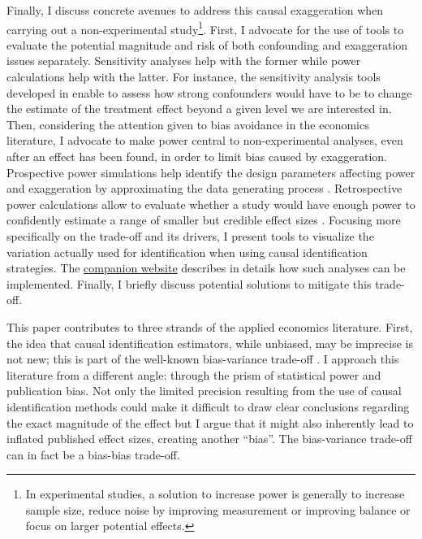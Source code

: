 			Finally, I discuss concrete avenues to address this causal exaggeration when carrying out a non-experimental study\footnote{In experimental studies, a solution to increase power is generally to increase sample size, reduce noise by improving measurement or improving balance or focus on larger potential effects.}. First, I advocate for the use of tools to evaluate the potential magnitude and risk of both confounding and exaggeration issues separately. Sensitivity analyses help with the former while power calculations help with the latter. %
			For instance, the sensitivity analysis tools developed in \cite{cinelli_making_2020} enable to assess how strong confounders would have to be to change the estimate of the treatment effect beyond a given level we are interested in. Then, considering the attention given to bias avoidance in the economics literature, I advocate to make power central to non-experimental analyses, even after an effect has been found, in order to limit bias caused by exaggeration. Prospective power simulations help identify the design parameters affecting power and exaggeration by approximating the data generating process \citep{gelman_regression_2020, black_simulated_2021}. Retrospective power calculations allow to evaluate whether a study would have enough power to confidently estimate a range of smaller but credible effect sizes \citep{gelman_beyond_2014, stommes_reliability_2021}.
			Focusing more specifically on the trade-off and its drivers, I present tools to visualize the variation actually used for identification when using causal identification strategies. The \href{https://vincentbagilet.github.io/causal_exaggeration/}{companion website} describes in details how such analyses can be implemented. Finally, I briefly discuss potential solutions to mitigate this trade-off.
						
			This paper contributes to three strands of the applied economics literature. First, the idea that causal identification estimators, while unbiased, may be imprecise is not new; this is part of the well-known bias-variance trade-off \citep{imbens_optimal_2012, deaton_understanding_2018, hernan_causal_2020, ravallion_should_2020}. I approach this literature from a different angle: through the prism of statistical power and publication bias. Not only the limited precision resulting from the use of causal identification methods could make it difficult to draw clear conclusions regarding the exact magnitude of the effect but I argue that it might also inherently lead to inflated published effect sizes, creating another ``bias''. The bias-variance trade-off can in fact be a bias-bias trade-off.
			
